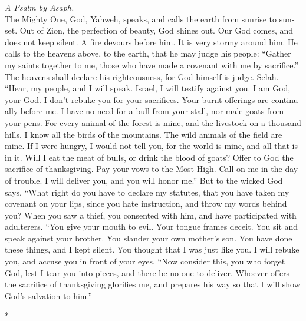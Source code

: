 \begin{paracol}{2}
\begin{otherlanguage}{english}
\emph{A Psalm by Asaph.}\\
 The Mighty One, God, Yahweh, speaks, and calls the earth
from sunrise to sunset.  Out of Zion, the perfection of
beauty, God shines out.  Our God comes, and does not keep
silent. A fire devours before him. It is very stormy around him.
 He calls to the heavens above, to the earth, that he may
judge his people:  ``Gather my saints together to me,
those who have made a covenant with me by sacrifice.'' 
The heavens shall declare his righteousness, for God himself is judge.
Selah.  ``Hear, my people, and I will speak. Israel, I
will testify against you. I am God, your God.  I don't
rebuke you for your sacrifices. Your burnt offerings are continually
before me.  I have no need for a bull from your stall, nor
male goats from your pens.  For every animal of the
forest is mine, and the livestock on a thousand hills.  I
know all the birds of the mountains. The wild animals of the field are
mine.  If I were hungry, I would not tell you, for the
world is mine, and all that is in it.  Will I eat the
meat of bulls, or drink the blood of goats?  Offer to God
the sacrifice of thanksgiving. Pay your vows to the Most High.
 Call on me in the day of trouble. I will deliver you,
and you will honor me.''  But to the wicked God says,
``What right do you have to declare my statutes, that you have taken my
covenant on your lips,  since you hate instruction, and
throw my words behind you?  When you saw a thief, you
consented with him, and have participated with adulterers.
 ``You give your mouth to evil. Your tongue frames
deceit.  You sit and speak against your brother. You
slander your own mother's son.  You have done these
things, and I kept silent. You thought that I was just like you. I will
rebuke you, and accuse you in front of your eyes.  ``Now
consider this, you who forget God, lest I tear you into pieces, and
there be no one to deliver.  Whoever offers the sacrifice
of thanksgiving glorifies me, and prepares his way so that I will show
God's salvation to him.''

\end{otherlanguage}

\switchcolumn[0]*

\hypertarget{oraciuxf3n-penitencial-de-david-cuarto-salmo-penitencial}{%
}
\end{paracol}
